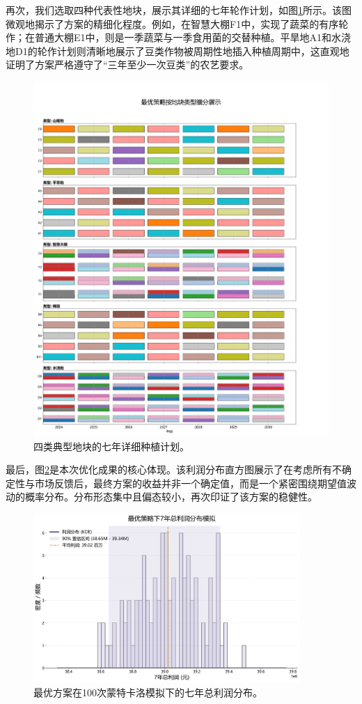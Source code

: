 再次，我们选取四种代表性地块，展示其详细的七年轮作计划，如图\ref{fig:plot_plan}所示。该图微观地揭示了方案的精细化程度。例如，在智慧大棚F1中，实现了蔬菜的有序轮作；在普通大棚E1中，则是一季蔬菜与一季食用菌的交替种植。平旱地A1和水浇地D1的轮作计划则清晰地展示了豆类作物被周期性地插入种植周期中，这直观地证明了方案严格遵守了“三年至少一次豆类”的农艺要求。

\begin{figure}[H]
    \centering
    \includegraphics[width=\textwidth]{figs/5问题三/典型地块种植计划图.png}
    \caption{四类典型地块的七年详细种植计划。}
    \label{fig:plot_plan}
\end{figure}

最后，图\ref{fig:profit_dist}是本次优化成果的核心体现。该利润分布直方图展示了在考虑所有不确定性与市场反馈后，最终方案的收益并非一个确定值，而是一个紧密围绕期望值波动的概率分布。分布形态集中且偏态较小，再次印证了该方案的稳健性。

\begin{figure}[H]
    \centering
    \includegraphics[width=0.9\textwidth]{figs/5问题三/利润分布图.png}
    \caption{最优方案在100次蒙特卡洛模拟下的七年总利润分布。}
    \label{fig:profit_dist}
\end{figure}



